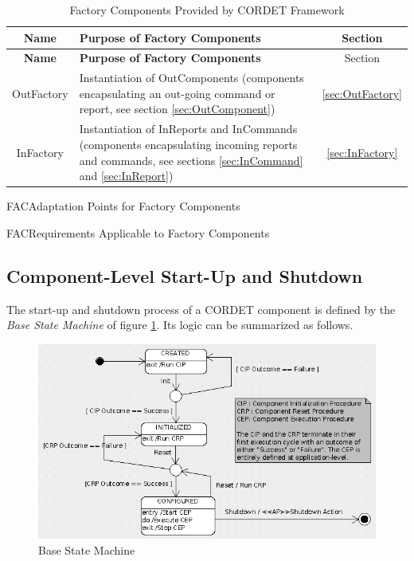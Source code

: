 \documentclass[a4paper,10pt]{article}
\newenvironment{cr_req}[2]
{%
\begin{longtable}{|l|p{9.8cm}|}
\caption{#2} \\
\hline
\rowcolor{light-gray}
\textbf{Req. ID} & \textbf{Requirement Text}\\
\hline\hline
\endfirsthead
\rowcolor{light-gray}
\textbf{Req. ID} & \textbf{Requirement Text}\\
\hline\hline
\endhead
\DTLforeach*[\DTLiseq{\cat}{#1}]{dbReq}{\cat=Category,\type=Type,\id=Id,\reqText=Text}
{\DTLiffirstrow{}{\\\hline}\cat-\id/\type & \textit{\reqText}}\\\hline
}
{\end{longtable}}
\newenvironment{cr_ap}[2]
{%
\begin{longtable}{|l|p{4.7cm}|p{4.9cm}|}
\caption{#2} \\
\hline
\rowcolor{light-gray}
\textbf{AP ID} & \textbf{Adaptation Point} & \textbf{Default Value}\\
\hline\hline
\endfirsthead
\rowcolor{light-gray}
\textbf{AP ID} & \textbf{Adaptation Point} & \textbf{Default Value}\\
\hline\hline
\endhead
\DTLforeach*[\DTLiseq{\cat}{#1}]{dbAP}{\cat=Category,\id=Id,\ap=AP,\defValue=DefValue}
{\DTLiffirstrow{}{\\\hline}\cat-\id & \ap & \defValue}\\\hline
}
{\end{longtable}}
\begin{document}
\begin{longtable}{|c|p{8cm}|c|}
\caption{Factory Components Provided by CORDET Framework}\label{tab:FactoryCmp} \\
\hline
\rowcolor{light-gray}
\textbf{Name} & \textbf{Purpose of Factory Components} & {Section}\\
\hline\hline
\endfirsthead
\rowcolor{light-gray}
\textbf{Name} & \textbf{Purpose of Factory Components} & {Section}\\
\hline\hline
\endhead
OutFactory & Instantiation of OutComponents (components encapsulating an out-going command or report, see section \ref{sec:OutComponent}) & {\ref{sec:OutFactory}}\\
\hline
InFactory & Instantiation of InReports and InCommands (components encapsulating incoming reports and commands, see sections \ref{sec:InCommand} and \ref{sec:InReport}) & {\ref{sec:InFactory}}\\
\hline
\end{longtable}
 
\begin{cr_ap}{FAC}{Adaptation Points for Factory Components}
\end{cr_ap}
\newpage
\begin{cr_req}{FAC}{Requirements Applicable to Factory Components}
\end{cr_req}

\subsection{Component-Level Start-Up and Shutdown}\label{sec:BaseCmp}
The start-up and shutdown process of a CORDET component is defined by the \textit{Base State Machine} of figure \ref{fig:BaseSM}. Its logic can be summarized as follows.

\begin{figure}[ht]
 \centering
 \includegraphics[scale=0.3,keepaspectratio=true]{BaseSM.png}
 \caption{Base State Machine}
 \label{fig:BaseSM}
\end{figure}
\end{document}
